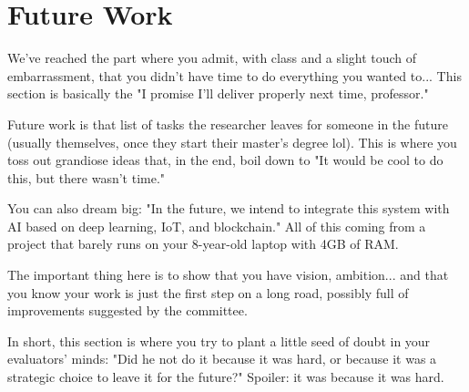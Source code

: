 \chapter{Future Work}
\label{chap:trabalhos_futuros}

We've reached the part where you admit, with class and a slight touch of embarrassment, that you didn't have time to do everything you wanted to... This section is basically the "I promise I'll deliver properly next time, professor."

Future work is that list of tasks the researcher leaves for someone in the future (usually themselves, once they start their master's degree lol). This is where you toss out grandiose ideas that, in the end, boil down to "It would be cool to do this, but there wasn't time."

You can also dream big: "In the future, we intend to integrate this system with AI based on deep learning, IoT, and blockchain." All of this coming from a project that barely runs on your 8-year-old laptop with 4GB of RAM.

The important thing here is to show that you have vision, ambition... and that you know your work is just the first step on a long road, possibly full of improvements suggested by the committee.

In short, this section is where you try to plant a little seed of doubt in your evaluators' minds: "Did he not do it because it was hard, or because it was a strategic choice to leave it for the future?" Spoiler: it was because it was hard.

